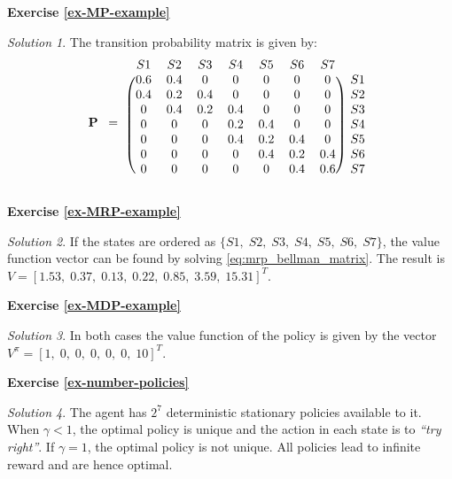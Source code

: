 \documentclass{article}
\theoremstyle{definition}
\theoremstyle{remark}
\newtheorem*{solution}{Solution}
\begin{document}
\textbf{Exercise \ref{ex-MP-example}}
\begin{solution}
The transition probability matrix is given by:
\[ \mathbf{P} \;\; = \;\;
\begin{blockarray}{cccccccc}
S1 & S2 & S3 & S4 & S5 & S6 & S7 \\
\begin{block}{(ccccccc)c}
  0.6  & 0.4 & 0   & 0   & 0   & 0   & 0   & S1 \\
  0 .4 & 0.2 & 0.4 & 0   & 0   & 0   & 0   & S2 \\
  0    & 0.4 & 0.2 & 0.4 & 0   & 0   & 0   & S3 \\
  0    & 0   & 0   & 0.2 & 0.4 & 0   & 0   & S4 \\
  0    & 0   & 0   & 0.4 & 0.2 & 0.4 & 0   & S5 \\
  0    & 0   & 0   & 0   & 0.4 & 0.2 & 0.4 & S6 \\
  0    & 0   & 0   & 0   & 0   & 0.4 & 0.6 & S7 \\
\end{block}
\end{blockarray}
\]
\end{solution}

\textbf{Exercise \ref{ex-MRP-example}}
\begin{solution}
If the states are ordered as $\{S1,\;S2,\;S3,\;S4,\;S5,\;S6,\;S7\}$, the value function vector can be found by solving \eqref{eq:mrp_bellman_matrix}. The result is $V = [1.53,\; 0.37,\; 0.13,\; 0.22,\; 0.85,\; 3.59,\; 15.31]^T$.
\end{solution}

\textbf{Exercise \ref{ex-MDP-example}}
\begin{solution}
In both cases the value function of the policy is given by the vector $V^{\pi}=[1,\; 0,\; 0,\; 0,\; 0,\; 0,\; 10]^T$.
\end{solution}

\textbf{Exercise \ref{ex-number-policies}}
\begin{solution}
The agent has $2^7$ deterministic stationary policies available to it. When $\gamma < 1$, the optimal policy is  unique and the action in each state is to \textit{``try right''}. If $\gamma = 1$, the optimal policy is not unique. All policies lead to infinite reward and are hence optimal.
\end{solution}
\end{document}
